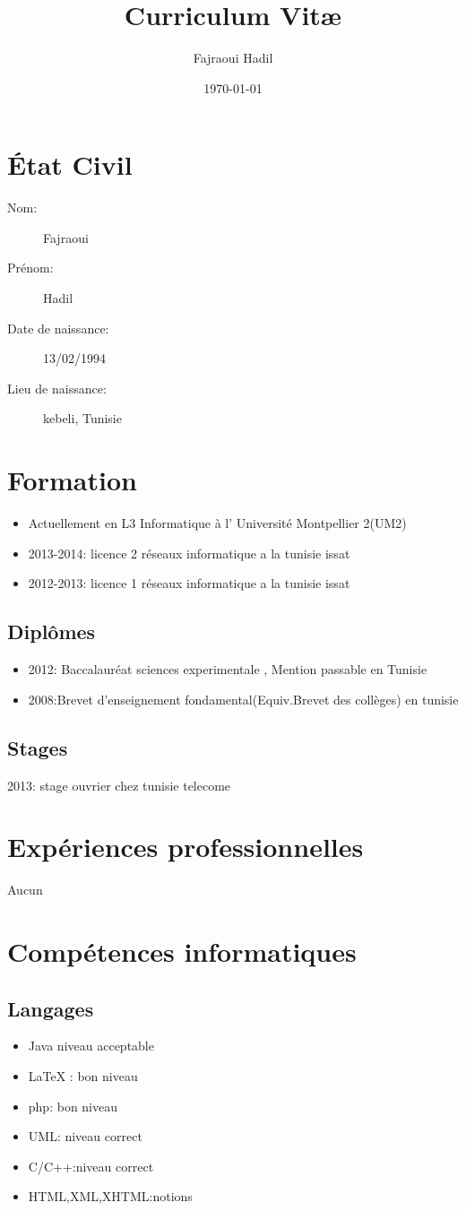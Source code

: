 \documentclass[a4paper]{article}
\title{Curriculum Vit\ae}
\author{Fajraoui Hadil}
\date{\today}
\begin{document}
\maketitle

\section{\'Etat Civil}
\begin{description}
\item[Nom:]{Fajraoui}
\item[Prénom: ]{Hadil}
\item[Date de naissance:]{13/02/1994}
\item[Lieu de naissance: ]{kebeli, Tunisie}
\end{description}
\section{Formation}
\begin{itemize}
\item{Actuellement en L3 Informatique à l' Université Montpellier 2(UM2)}
\item{2013-2014: licence 2 réseaux informatique  a la tunisie issat }
\item{2012-2013: licence 1 réseaux informatique  a la tunisie issat }
\end{itemize}
\subsection{Diplômes}
\begin{itemize}
\item{2012: Baccalauréat sciences experimentale  , Mention passable en Tunisie}
\item{2008:Brevet d'enseignement fondamental(Equiv.Brevet des collèges) en tunisie }
\end{itemize}
\subsection{Stages}
2013: stage ouvrier chez tunisie telecome 
\section{Expériences professionnelles}
Aucun
\section*{Compétences informatiques}
\subsection*{Langages}
\begin{itemize}
\item{Java niveau acceptable}
\item{\LaTeX{} : bon niveau}
\item{php: bon niveau}
\item{UML: niveau correct}
\item{C/C++:niveau correct}
\item{HTML,XML,XHTML:notions}
\end{itemize}
\end{document}
